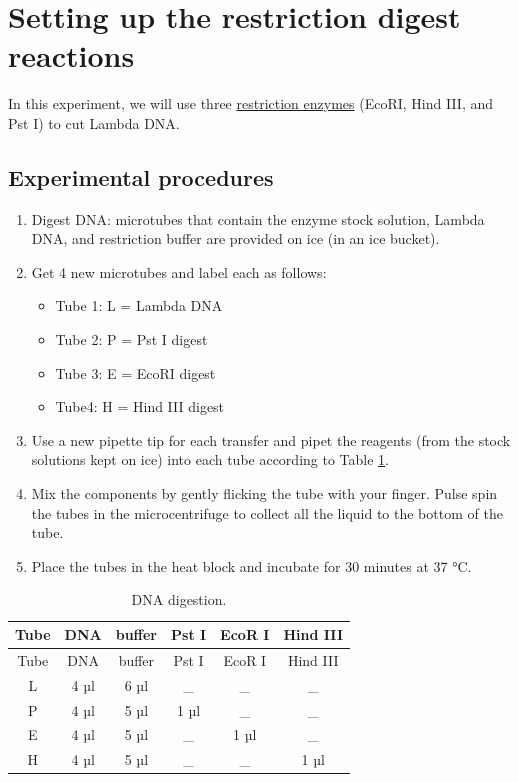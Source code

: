 \section{Setting up the restriction digest reactions}\label{setting-up-the-restriction-digest-reactions}

In this experiment, we will use three \href{https://en.wikipedia.org/wiki/Restriction_enzyme}{restriction enzymes} (EcoRI, Hind III, and Pst I) to cut Lambda DNA.

\subsection{Experimental procedures}\label{experimental-procedures-33}

\begin{enumerate}
\def\labelenumi{\arabic{enumi}.}
\tightlist
\item
  Digest DNA: microtubes that contain the enzyme stock solution, Lambda DNA, and restriction buffer are provided on ice (in an ice bucket).
\item
  Get 4 new microtubes and label each as follows:

  \begin{itemize}
  \tightlist
  \item
    Tube 1: L = Lambda DNA
  \item
    Tube 2: P = Pst I digest
  \item
    Tube 3: E = EcoRI digest
  \item
    Tube4: H = Hind III digest
  \end{itemize}
\item
  Use a new pipette tip for each transfer and pipet the reagents (from the stock solutions kept on ice) into each tube according to Table \ref{tab:digest}.
\item
  Mix the components by gently flicking the tube with your finger. Pulse spin the tubes in the microcentrifuge to collect all the liquid to the bottom of the tube.
\item
  Place the tubes in the heat block and incubate for 30 minutes at 37 °C.
\end{enumerate}

\begin{longtable}[]{@{}cccccc@{}}
\caption{\label{tab:digest} DNA digestion.}\tabularnewline
\toprule
Tube & DNA & buffer & Pst I & EcoR I & Hind III\tabularnewline
\midrule
\endfirsthead
\toprule
Tube & DNA & buffer & Pst I & EcoR I & Hind III\tabularnewline
\midrule
\endhead
L & 4 µl & 6 µl & \_ & \_ & \_\tabularnewline
P & 4 µl & 5 µl & 1 µl & \_ & \_\tabularnewline
E & 4 µl & 5 µl & \_ & 1 µl & \_\tabularnewline
H & 4 µl & 5 µl & \_ & \_ & 1 µl\tabularnewline
\bottomrule
\end{longtable}

